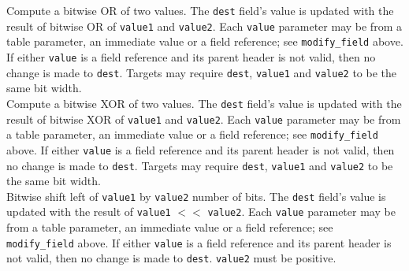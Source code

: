 \documentclass[12pt]{article}
\begin{document}

{ %
\color{red}Compute a bitwise OR of two values.
}
{ %
}
{ %
\color{red}
The \texttt{dest} field's value is updated with the result of bitwise OR of
\texttt{value1} and \texttt{value2}. Each \texttt{value} parameter may be from a
table parameter, an immediate value or a field reference; see \texttt{modify_field} above. If either \texttt{value}
is a field reference and its parent header is not valid, then no
change is made to \texttt{dest}. 
Targets may require \texttt{dest}, \texttt{value1} and \texttt{value2} to
be the same bit width.
}\\


{ %
\color{red}Compute a bitwise XOR of two values.
}
{ %
}
{ %
\color{red}
The \texttt{dest} field's value is updated with the result of bitwise XOR of
\texttt{value1} and \texttt{value2}. Each \texttt{value} parameter may be from a
table parameter, an immediate value or a field reference; see \texttt{modify_field} above. If either \texttt{value}
is a field reference and its parent header is not valid, then no
change is made to \texttt{dest}. 
Targets may require \texttt{dest}, \texttt{value1} and \texttt{value2} to
be the same bit width.
}\\


{ %
\color{red}Bitwise shift left of \texttt{value1} by \texttt{value2} number of bits.
}
{ %
}
{ %
\color{red}
The \texttt{dest} field's value is updated with the result of 
\texttt{value1} $<<$ \texttt{value2}. Each \texttt{value} parameter may be from a
table parameter, an immediate value or a field reference; see \texttt{modify_field} above. If either \texttt{value}
is a field reference and its parent header is not valid, then no
change is made to \texttt{dest}. \texttt{value2} must be positive. 
}\\
\end{document}
